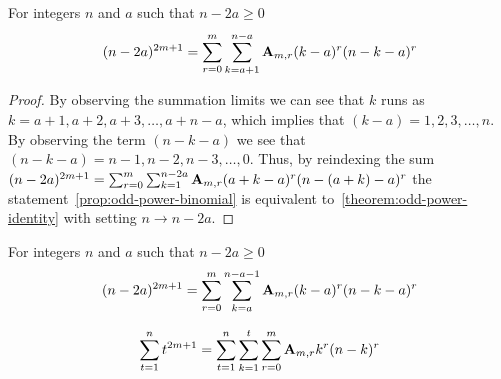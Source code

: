 
\begin{proposition}
    \label{prop:odd-power-binomial}
    For integers $n$ and $a$ such that $n-2a \geq 0$
    \begin{align*}
    (n-2a)
        ^{2m+1} = \sum_{r=0}^{m} \sum_{k=a+1}^{n-a} {\mathbf{A}} \sb{m,r} (k-a)^r (n-k-a)^r
    \end{align*}
    \begin{proof}
        By observing the summation limits we can see that $k$ runs as $k=a+1,a+2,a+3,\ldots,a+n-a$, which
        implies that $(k-a)=1,2,3,\ldots, n$.
        By observing the term $(n-k-a)$ we see that $(n-k-a)=n-1,n-2,n-3,\ldots,0$.
        Thus, by reindexing the sum
        $(n-2a)^{2m+1} = \sum_{r=0}^{m} \sum_{k=1}^{n-2a} {\mathbf{A}} \sb{m,r} (a+k-a)^r (n-(a+k)-a)^r$
        the statement~\eqref{prop:odd-power-binomial} is equivalent to~\eqref{theorem:odd-power-identity}
        with setting $n \rightarrow n-2a$.
    \end{proof}
\end{proposition}

\begin{corollary}
    \label{prop:odd-power-binomial-shifted}
    For integers $n$ and $a$ such that $n-2a \geq 0$
    \begin{align*}
    (n-2a)
        ^{2m+1} = \sum_{r=0}^{m} \sum_{k=a}^{n-a-1} {\mathbf{A}} \sb{m,r} (k-a)^r (n-k-a)^r
    \end{align*}
\end{corollary}

\begin{proposition}
    \label{prop:sum-of-odd-powers}
    \begin{align*}
        \sum_{t=1}^{n} t^{2m+1} = \sum_{t=1}^{n} \sum_{k=1}^{t} \sum_{r=0}^{m} {\mathbf{A}} \sb{m,r} k^r (n-k)^r
    \end{align*}
\end{proposition}

